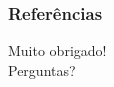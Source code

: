 
\begin{frame}[allowframebreaks]
  \frametitle{Referências}
  \nocite{*}
  \printbibliography
\end{frame}

\begin{frame}
  \begin{center}
    \LARGE Muito obrigado!\\
    \vspace{0.66cm}
    \Large Perguntas?
    \vspace{0.66cm}
  \end{center}
\end{frame}
